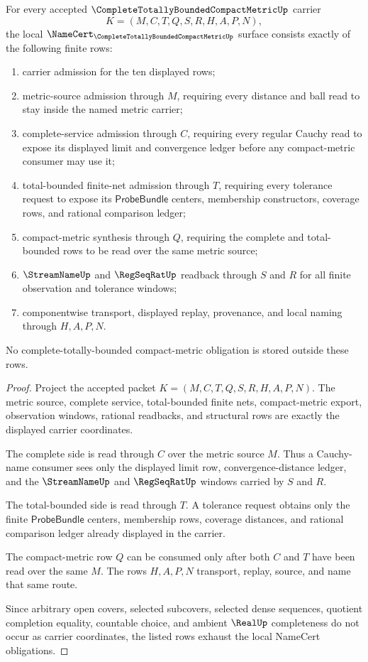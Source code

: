 \begin{theorem}
\label{thm:complete-totally-bounded-compact-metric-namecert-obligations}
For every accepted $\CompleteTotallyBoundedCompactMetricUp$ carrier
$$
K=(M,C,T,Q,S,R,H,A,P,N),
$$
the local $\NameCert_{\CompleteTotallyBoundedCompactMetricUp}$ surface consists exactly of the following finite rows:
\begin{enumerate}
\item carrier admission for the ten displayed rows;
\item metric-source admission through $M$, requiring every distance and ball read to stay inside the named metric carrier;
\item complete-service admission through $C$, requiring every regular Cauchy read to expose its displayed limit and convergence ledger before any compact-metric consumer may use it;
\item total-bounded finite-net admission through $T$, requiring every tolerance request to expose its $\mathsf{ProbeBundle}$ centers, membership constructors, coverage rows, and rational comparison ledger;
\item compact-metric synthesis through $Q$, requiring the complete and total-bounded rows to be read over the same metric source;
\item $\StreamNameUp$ and $\RegSeqRatUp$ readback through $S$ and $R$ for all finite observation and tolerance windows;
\item componentwise transport, displayed replay, provenance, and local naming through $H,A,P,N$.
\end{enumerate}
No complete-totally-bounded compact-metric obligation is stored outside these rows.
\end{theorem}
\begin{proof}
Project the accepted packet $K=(M,C,T,Q,S,R,H,A,P,N)$. The metric source, complete service, total-bounded finite nets, compact-metric export, observation windows, rational readbacks, and structural rows are exactly the displayed carrier coordinates.

The complete side is read through $C$ over the metric source $M$. Thus a Cauchy-name consumer sees only the displayed limit row, convergence-distance ledger, and the $\StreamNameUp$ and $\RegSeqRatUp$ windows carried by $S$ and $R$.

The total-bounded side is read through $T$. A tolerance request obtains only the finite $\mathsf{ProbeBundle}$ centers, membership rows, coverage distances, and rational comparison ledger already displayed in the carrier.

The compact-metric row $Q$ can be consumed only after both $C$ and $T$ have been read over the same $M$. The rows $H,A,P,N$ transport, replay, source, and name that same route.

Since arbitrary open covers, selected subcovers, selected dense sequences, quotient completion equality, countable choice, and ambient $\RealUp$ completeness do not occur as carrier coordinates, the listed rows exhaust the local NameCert obligations.
\end{proof}

